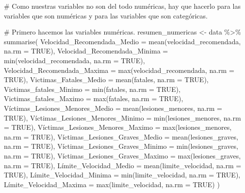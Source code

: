 \documentclass[
  letterpaper,
  DIV=11,
  numbers=noendperiod]{scrartcl}
\newenvironment{Shaded}{\begin{snugshade}}{\end{snugshade}}
\newcommand{\AttributeTok}[1]{\textcolor[rgb]{0.40,0.45,0.13}{#1}}
\newcommand{\CommentTok}[1]{\textcolor[rgb]{0.37,0.37,0.37}{#1}}
\newcommand{\ConstantTok}[1]{\textcolor[rgb]{0.56,0.35,0.01}{#1}}
\newcommand{\FunctionTok}[1]{\textcolor[rgb]{0.28,0.35,0.67}{#1}}
\newcommand{\NormalTok}[1]{\textcolor[rgb]{0.00,0.23,0.31}{#1}}
\newcommand{\OtherTok}[1]{\textcolor[rgb]{0.00,0.23,0.31}{#1}}
\newcommand{\SpecialCharTok}[1]{\textcolor[rgb]{0.37,0.37,0.37}{#1}}
\begin{document}
\begin{Shaded}
\begin{Highlighting}[]
\CommentTok{\# Como nuestras variables no son del todo numéricas, hay que hacerlo para las variables que son numéricas y para las variables que son categóricas. }

\CommentTok{\# Primero hacemos las variables numéricas.}
\NormalTok{resumen\_numericas }\OtherTok{\textless{}{-}}\NormalTok{ data }\SpecialCharTok{\%\textgreater{}\%}
  \FunctionTok{summarise}\NormalTok{(}
    \AttributeTok{Velocidad\_Recomendada\_Medio =} \FunctionTok{mean}\NormalTok{(velocidad\_recomendada, }\AttributeTok{na.rm =} \ConstantTok{TRUE}\NormalTok{),}
    \AttributeTok{Velocidad\_Recomendada\_Minima =} \FunctionTok{min}\NormalTok{(velocidad\_recomendada, }\AttributeTok{na.rm =} \ConstantTok{TRUE}\NormalTok{),}
    \AttributeTok{Velocidad\_Recomendada\_Maxima =} \FunctionTok{max}\NormalTok{(velocidad\_recomendada, }\AttributeTok{na.rm =} \ConstantTok{TRUE}\NormalTok{),}
    \AttributeTok{Victimas\_Fatales\_Medio =} \FunctionTok{mean}\NormalTok{(fatales, }\AttributeTok{na.rm =} \ConstantTok{TRUE}\NormalTok{),}
    \AttributeTok{Victimas\_fatales\_Minimo =} \FunctionTok{min}\NormalTok{(fatales, }\AttributeTok{na.rm =} \ConstantTok{TRUE}\NormalTok{),}
    \AttributeTok{Victimas\_fatales\_Maximo =} \FunctionTok{max}\NormalTok{(fatales, }\AttributeTok{na.rm =} \ConstantTok{TRUE}\NormalTok{),}
\NormalTok{    Víctimas}\AttributeTok{\_Lesiones\_Menores\_Medio =} \FunctionTok{mean}\NormalTok{(lesiones\_menores, }\AttributeTok{na.rm =} \ConstantTok{TRUE}\NormalTok{),}
\NormalTok{    Víctimas}\AttributeTok{\_Lesiones\_Menores\_Minimo =} \FunctionTok{min}\NormalTok{(lesiones\_menores, }\AttributeTok{na.rm =} \ConstantTok{TRUE}\NormalTok{),}
\NormalTok{    Víctimas}\AttributeTok{\_Lesiones\_Menores\_Maximo =} \FunctionTok{max}\NormalTok{(lesiones\_menores, }\AttributeTok{na.rm =} \ConstantTok{TRUE}\NormalTok{),}
\NormalTok{    Víctimas}\AttributeTok{\_Lesiones\_Graves\_Medio =} \FunctionTok{mean}\NormalTok{(lesiones\_graves, }\AttributeTok{na.rm =} \ConstantTok{TRUE}\NormalTok{),}
\NormalTok{    Víctimas}\AttributeTok{\_Lesiones\_Graves\_Minimo =} \FunctionTok{min}\NormalTok{(lesiones\_graves, }\AttributeTok{na.rm =} \ConstantTok{TRUE}\NormalTok{),}
\NormalTok{    Víctimas}\AttributeTok{\_Lesiones\_Graves\_Maximo =} \FunctionTok{max}\NormalTok{(lesiones\_graves, }\AttributeTok{na.rm =} \ConstantTok{TRUE}\NormalTok{),}
\NormalTok{    Límite}\AttributeTok{\_Velocidad\_Medio =} \FunctionTok{mean}\NormalTok{(limite\_velocidad, }\AttributeTok{na.rm =} \ConstantTok{TRUE}\NormalTok{),}
\NormalTok{    Límite}\AttributeTok{\_Velocidad\_Minima =} \FunctionTok{min}\NormalTok{(limite\_velocidad, }\AttributeTok{na.rm =} \ConstantTok{TRUE}\NormalTok{),}
\NormalTok{    Límite}\AttributeTok{\_Velocidad\_Maxima =} \FunctionTok{max}\NormalTok{(limite\_velocidad, }\AttributeTok{na.rm =} \ConstantTok{TRUE}\NormalTok{)}
\NormalTok{  )}


\end{Highlighting}
\end{Shaded}
\end{document}
